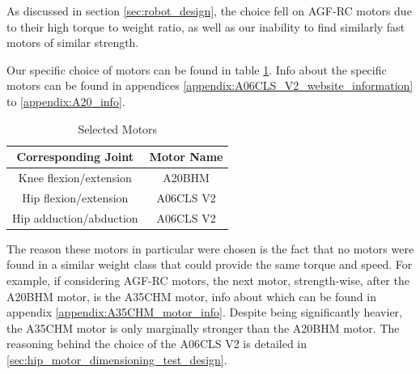 As discussed in section \ref{sec:robot_design}, the choice fell on AGF-RC motors due to their high torque to weight ratio, as well as our inability to find similarly fast motors of similar strength. 

Our specific choice of motors can be found in table \ref{tab:motor_selection}. Info about the specific motors can be found in appendices \ref{appendix:A06CLS_V2_website_information} to \ref{appendix:A20_info}.

\begin{table}[h!]
    \centering
    \begin{tabular}{|c|c|}
        \hline
        Corresponding Joint & Motor Name\\ \hline
        Knee flexion/extension & A20BHM \\
        Hip flexion/extension & A06CLS V2 \\
        Hip adduction/abduction & A06CLS V2 \\ \hline
    \end{tabular}
    \caption{Selected Motors}
    \label{tab:motor_selection}
\end{table}

The reason these motors in particular were chosen is the fact that no motors were found in a similar weight class that could provide the same torque and speed. For example, if considering AGF-RC motors, the next motor, strength-wise, after the A20BHM motor, is the A35CHM motor, info about which can be found in appendix \ref{appendix:A35CHM_motor_info}. Despite being significantly heavier, the A35CHM motor is only marginally stronger than the A20BHM motor. The reasoning behind the choice of the A06CLS V2 is detailed in \ref{sec:hip_motor_dimensioning_test_design}. 